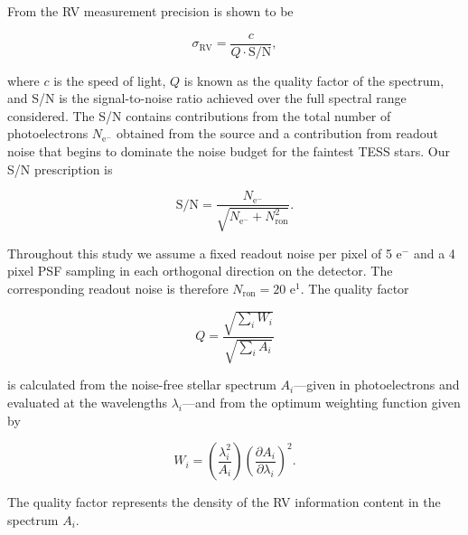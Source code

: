 From \cite{bouchy01} the RV measurement precision \sigRV{} is shown to be

\begin{equation}
  \sigma_{\text{RV}} = \frac{c}{Q \cdot \text{S/N}},
  \label{RVFCeq:sigrv}
\end{equation}

\noindent where $c$ is the speed of light, $Q$ is known as the quality factor of the spectrum,
and S/N is the signal-to-noise ratio achieved over the full spectral range considered. The
S/N contains contributions from the total number of photoelectrons $N_{\text{e}^-}$ obtained from
the source and a contribution from readout noise that begins to dominate the noise budget for the
faintest TESS stars. Our S/N prescription is

\begin{equation}
  \text{S/N} = \frac{N_{\text{e}^-}}{\sqrt{N_{\text{e}^-} + N_{\text{ron}}^2}}.
\end{equation}
  
\noindent Throughout this study we assume
  a fixed readout noise per pixel of 5 e$^-$ and a 4 pixel PSF sampling in
  each orthogonal direction on the detector. The corresponding readout noise is therefore  
  $N_{\text{ron}} = 20$ e$^1$. The quality factor

\begin{equation}
  Q = \frac{\sqrt{\sum_i{W_i}}}{\sqrt{\sum_i{A_i}}}
\end{equation}

\noindent is calculated from the noise-free stellar spectrum $A_i$---given in photoelectrons
and evaluated at the wavelengths $\lambda_i$---and from the optimum weighting function given
by

\begin{equation}
  W_i = \left( \frac{\lambda_i^2}{A_i} \right) \left( \frac{\partial A_i}{\partial \lambda_i} \right)^2.
\end{equation}

\noindent The quality factor represents the density of the RV information content in the spectrum
$A_i$. \\

